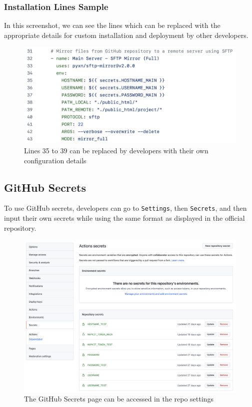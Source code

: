 \documentclass[12pt, letterpaper]{article}
\begin{document}
 \subsubsection*{Installation Lines Sample}
In this screenshot, we can see the lines which can be replaced with the appropriate details for custom installation and deployment by other developers.
\begin{figure}[htbp]
	\centering
	\includegraphics[width=\textwidth]{images/25-sftp-mirror-modify.png}
	\caption{Lines 35 to 39 can be replaced by developers with their own configuration details}
 \end{figure}

 \newpage
 \subsection*{GitHub Secrets}
To use GitHub secrets, developers can go to \lstinline{Settings}, then \lstinline{Secrets}, and then input their own secrets while using the same format as displayed in the official repository.

\begin{figure}[htbp]
	\centering
	\includegraphics[width=\textwidth]{images/25-github-secrets.png}
	\caption{The GitHub Secrets page can be accessed in the repo settings}
 \end{figure}
\end{document}
